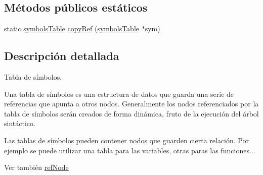 \subsection*{Métodos públicos estáticos}
\begin{DoxyCompactItemize}
\item 
static \hyperlink{classsymbolsTable}{symbols\-Table} \hyperlink{classsymbolsTable_a320acaa976beb549c47ae99b57ad1047}{copy\-Ref} (\hyperlink{classsymbolsTable}{symbols\-Table} $\ast$sym)
\end{DoxyCompactItemize}


\subsection{Descripción detallada}
Tabla de símbolos. 

Una tabla de símbolos es una estructura de datos que guarda una serie de referencias que apunta a otros nodos. Generalmente los nodos referenciados por la tabla de símbolos serán creados de forma dinámica, fruto de la ejecución del árbol sintáctico.

Las tablas de símbolos pueden contener nodos que guarden cierta relación. Por ejemplo se puede utilizar una tabla para las variables, otras paras las funciones...

\begin{DoxySeeAlso}{Ver también}
\hyperlink{classrefNode}{ref\-Node} 
\end{DoxySeeAlso}


